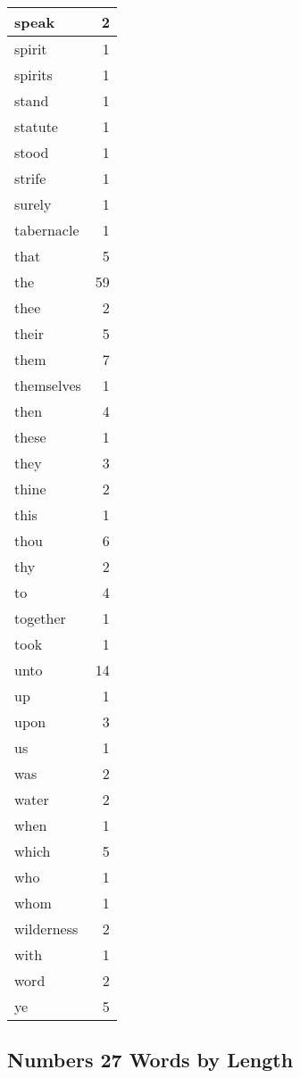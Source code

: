 \begin{center}
\begin{longtable}{l|r}
speak & 2\\ \hline 
spirit & 1\\ \hline 
spirits & 1\\ \hline 
stand & 1\\ \hline 
statute & 1\\ \hline 
stood & 1\\ \hline 
strife & 1\\ \hline 
surely & 1\\ \hline 
tabernacle & 1\\ \hline 
that & 5\\ \hline 
the & 59\\ \hline 
thee & 2\\ \hline 
their & 5\\ \hline 
them & 7\\ \hline 
themselves & 1\\ \hline 
then & 4\\ \hline 
these & 1\\ \hline 
they & 3\\ \hline 
thine & 2\\ \hline 
this & 1\\ \hline 
thou & 6\\ \hline 
thy & 2\\ \hline 
to & 4\\ \hline 
together & 1\\ \hline 
took & 1\\ \hline 
unto & 14\\ \hline 
up & 1\\ \hline 
upon & 3\\ \hline 
us & 1\\ \hline 
was & 2\\ \hline 
water & 2\\ \hline 
when & 1\\ \hline 
which & 5\\ \hline 
who & 1\\ \hline 
whom & 1\\ \hline 
wilderness & 2\\ \hline 
with & 1\\ \hline 
word & 2\\ \hline 
ye & 5\\ \hline 
\end{longtable}
\end{center}





\subsection{Numbers 27 Words by Length}


